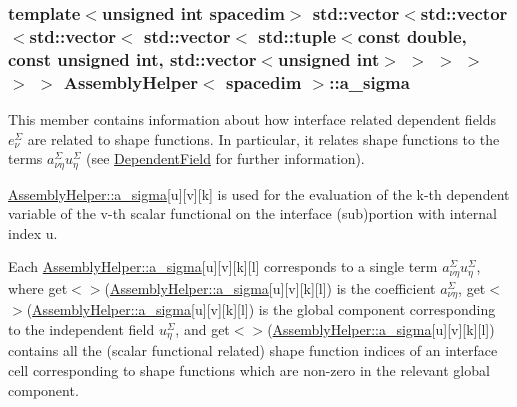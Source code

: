 \subsubsection[{\texorpdfstring{a\+\_\+sigma}{a_sigma}}]{\setlength{\rightskip}{0pt plus 5cm}template$<$unsigned int spacedim$>$ std\+::vector$<$std\+::vector$<$std\+::vector$<$ std\+::vector$<$ std\+::tuple$<$const double, const unsigned int, std\+::vector$<$unsigned int$>$ $>$ $>$ $>$ $>$ $>$ {\bf Assembly\+Helper}$<$ spacedim $>$\+::a\+\_\+sigma\hspace{0.3cm}{\ttfamily [private]}}\hypertarget{class_assembly_helper_aa266cc07e9670319481da52d633d2583}{}\label{class_assembly_helper_aa266cc07e9670319481da52d633d2583}
This member contains information about how interface related dependent fields $e^\Sigma_\nu$ are related to shape functions. In particular, it relates shape functions to the terms $a^\Sigma_{\nu\eta} u^\Sigma_\eta$ (see \hyperlink{class_dependent_field}{Dependent\+Field} for further information).

\hyperlink{class_assembly_helper_aa266cc07e9670319481da52d633d2583}{Assembly\+Helper\+::a\+\_\+sigma}\mbox{[}{\ttfamily u}\mbox{]}\mbox{[}{\ttfamily v}\mbox{]}\mbox{[}{\ttfamily k}\mbox{]} is used for the evaluation of the {\ttfamily k-\/th} dependent variable of the {\ttfamily v-\/th} scalar functional on the interface (sub)portion with internal index {\ttfamily u}.

Each \hyperlink{class_assembly_helper_aa266cc07e9670319481da52d633d2583}{Assembly\+Helper\+::a\+\_\+sigma}\mbox{[}{\ttfamily u}\mbox{]}\mbox{[}{\ttfamily v}\mbox{]}\mbox{[}{\ttfamily k}\mbox{]}\mbox{[}{\ttfamily l}\mbox{]} corresponds to a single term $a^\Sigma_{\nu\eta} u^\Sigma_\eta$, where {\ttfamily get$<${$>$}(\hyperlink{class_assembly_helper_aa266cc07e9670319481da52d633d2583}{Assembly\+Helper\+::a\+\_\+sigma}}\mbox{[}{\ttfamily u}\mbox{]}\mbox{[}{\ttfamily v}\mbox{]}\mbox{[}{\ttfamily k}\mbox{]}\mbox{[}{\ttfamily l}\mbox{]}) is the coefficient $a^\Sigma_{\nu \eta}$, {\ttfamily get$<${$>$}(\hyperlink{class_assembly_helper_aa266cc07e9670319481da52d633d2583}{Assembly\+Helper\+::a\+\_\+sigma}}\mbox{[}{\ttfamily u}\mbox{]}\mbox{[}{\ttfamily v}\mbox{]}\mbox{[}{\ttfamily k}\mbox{]}\mbox{[}{\ttfamily l}\mbox{]}) is the global component corresponding to the independent field $u^\Sigma_\eta$, and {\ttfamily get$<${$>$}(\hyperlink{class_assembly_helper_aa266cc07e9670319481da52d633d2583}{Assembly\+Helper\+::a\+\_\+sigma}}\mbox{[}{\ttfamily u}\mbox{]}\mbox{[}{\ttfamily v}\mbox{]}\mbox{[}{\ttfamily k}\mbox{]}\mbox{[}{\ttfamily l}\mbox{]}) contains all the (scalar functional related) shape function indices of an interface cell corresponding to shape functions which are non-\/zero in the relevant global component. 
